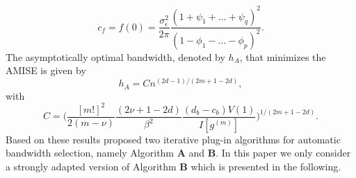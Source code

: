 \documentclass[12pt]{article}
\newtheorem{theorem}{Theorem}
\begin{document}
\begin{equation}
	c_f = f(0) = \frac{\sigma^2_\epsilon}{2\pi} \frac{(1 + \psi_1+\dots+\psi_q)^2}{(1-\phi_1-\dots-\phi_p)^2}.
\end{equation}
 The asymptotically optimal bandwidth, denoted by $h_A$, that minimizes the AMISE is given by
\begin{equation}
	\label{ha1}
h_A=Cn^{(2d-1)/(2m+1-2d)},
\end{equation}
with 
\begin{equation}
\label{ha2}
C=\Bigg(\frac{[m!]^2}{2(m-\nu)} \frac{(2\nu+1-2d)}{\beta^2}\frac{(d_b - c_b)V(1)}{I[g^{(m)}]}\Bigg)^{1/(2m+1-2d)}.
\end{equation}
Based on these results \citet{beran2002iterative} proposed two iterative plug-in algorithms for automatic bandwidth selection, namely Algorithm \textbf{A} and \textbf{B}. In this paper we only consider a strongly adapted version of Algorithm \textbf{B} which is presented in the following.


 
%
\end{document}
